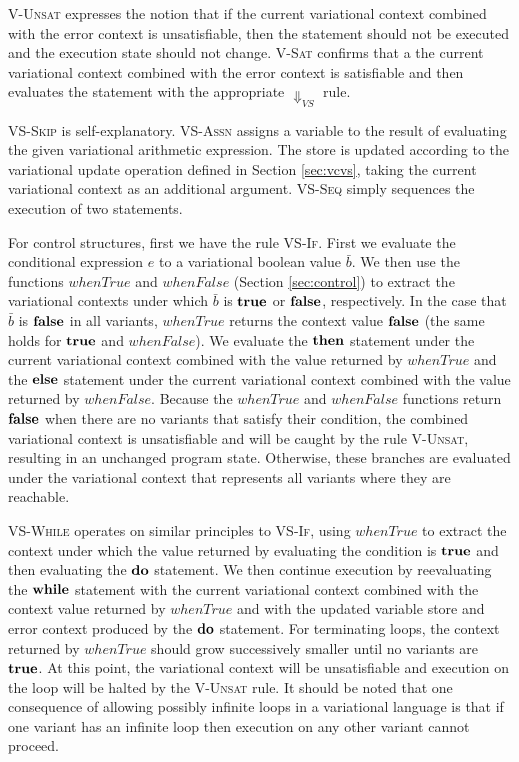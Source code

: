 \documentclass[12pt,oneside]{book}
\begin{document}
\textsc{V-Unsat} expresses the notion that if the current variational context combined with the error context is unsatisfiable, then the statement should
not be executed and the execution state should not change. \textsc{V-Sat} confirms that a the current variational context combined with the error context
is satisfiable and then evaluates the statement with the appropriate $\Downarrow_{VS}$ rule.

\textsc{VS-Skip} is self-explanatory. \textsc{VS-Assn} assigns a variable to the result of evaluating the given variational arithmetic expression.
The store is updated according to the variational update operation defined in Section \ref{sec:vcvs}, taking the current variational context as an additional argument.
\textsc{VS-Seq} simply sequences the execution of two statements.

For control structures, first we have the rule \textsc{VS-If}. First we evaluate the conditional expression $e$ to a variational boolean value $\bar{b}$.
We then use the functions $\mathit{whenTrue}$ and $\mathit{whenFalse}$ (Section \ref{sec:control}) to extract the variational contexts under
which $\bar{b}$ is $\textbf{\textup{\textrm{true}}}$ or $\textbf{\textup{\textrm{false}}}$, respectively. In the case that $\bar{b}$ is $\textbf{\textup{\textrm{false}}}$ in all variants, $\mathit{whenTrue}$
returns the context value $\textbf{\textup{\textrm{false}}}$ (the same holds for $\textbf{\textup{\textrm{true}}}$ and $\mathit{whenFalse}$). We evaluate the $\textbf{\textup{\textrm{then}}}$
statement under the current variational context combined with the value returned by $\mathit{whenTrue}$ and the $\textbf{\textup{\textrm{else}}}$ statement under
the current variational context combined with the value returned by $\mathit{whenFalse}$. Because the $\mathit{whenTrue}$ and $\mathit{whenFalse}$
functions return $\textbf{\textup{\textrm{false}}}$ when there are no variants that satisfy their condition, the combined variational context is unsatisfiable and will be
caught by the rule \textsc{V-Unsat}, resulting in an unchanged program state. Otherwise, these branches are evaluated under the variational context
that represents all variants where they are reachable.

\textsc{VS-While} operates on similar principles to \textsc{VS-If}, using $\mathit{whenTrue}$ to extract the context under which the value
returned by evaluating the condition is $\textbf{\textup{\textrm{true}}}$ and then evaluating the $\textbf{\textup{\textrm{do}}}$ statement. We then continue execution
by reevaluating the $\textbf{\textup{\textrm{while}}}$ statement with the current variational context combined with the context value returned by $\mathit{whenTrue}$
and with the updated variable store and error context produced by the $\textbf{\textup{\textrm{do}}}$ statement.
For terminating loops, the context
returned by $\mathit{whenTrue}$ should grow successively smaller until no variants are $\textbf{\textup{\textrm{true}}}$. At this point, the variational context will be
unsatisfiable and execution on the loop will be halted by the \textsc{V-Unsat} rule. It should be noted that one consequence of allowing possibly infinite
loops in a variational language is that if one variant has an infinite loop then execution on any other variant cannot proceed.
\end{document}
